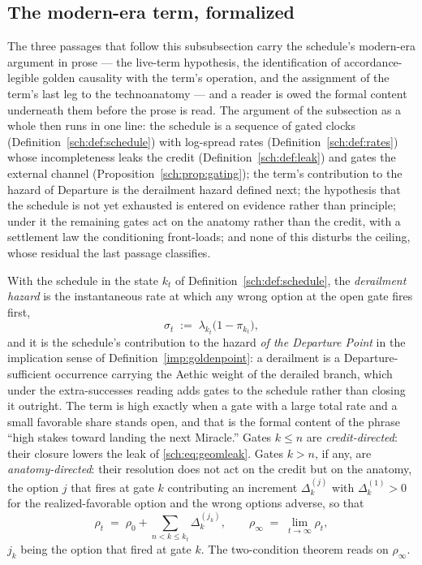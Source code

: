 \subsection{The modern-era term, formalized}\label{sch:subsub:modernterm}

The three passages that follow this subsubsection carry the
schedule's modern-era argument in prose --- the live-term
hypothesis, the identification of accordance-legible golden
causality with the term's operation, and the assignment of the
term's last leg to the technoanatomy --- and a reader is owed the
formal content underneath them before the prose is read. The
argument of the subsection as a whole then runs in one line: the
schedule is a sequence of gated clocks (Definition~\ref{sch:def:schedule})
with log-spread rates (Definition~\ref{sch:def:rates}) whose
incompleteness leaks the credit (Definition~\ref{sch:def:leak}) and
gates the external channel (Proposition~\ref{sch:prop:gating}); the
term's contribution to the hazard of Departure is the derailment
hazard defined next; the hypothesis that the schedule is not yet
exhausted is entered on evidence rather than principle; under it the
remaining gates act on the anatomy rather than the credit, with a
settlement law the conditioning front-loads; and none of this
disturbs the ceiling, whose residual the last passage classifies.

\begin{definition}\label{sch:def:derailment}
With the schedule in the state $k_t$ of Definition~\ref{sch:def:schedule},
the \emph{derailment hazard} is the instantaneous rate at which any
wrong option at the open gate fires first,
\begin{equation}\label{sch:eq:derailment}
\sigma_t\;:=\;\lambda_{k_t}\bigl(1-\pi_{k_t}\bigr),
\end{equation}
and it is the schedule's contribution to the hazard \emph{of the
Departure Point} in the implication sense of
Definition~\ref{imp:goldenpoint}: a derailment is a Departure-sufficient
occurrence carrying the Aethic weight of the derailed branch, which
under the extra-successes reading adds gates to the schedule rather
than closing it outright. The term is high exactly when a gate with a
large total rate and a small favorable share stands open, and that is
the formal content of the phrase ``high stakes toward landing the next
Miracle.'' Gates $k\le n$ are \emph{credit-directed}: their closure
lowers the leak of \eqref{sch:eq:geomleak}. Gates $k>n$, if any, are
\emph{anatomy-directed}: their resolution does not act on the credit
but on the anatomy, the option $j$ that fires at gate $k$ contributing
an increment $\Delta_{k}^{(j)}$ with $\Delta_{k}^{(1)}>0$ for the
realized-favorable option and the wrong options adverse, so that
\begin{equation}\label{sch:eq:rhoprocess}
\rho_t\;=\;\rho_0+\sum_{n<k\le k_t}\Delta_{k}^{(j_k)},
\qquad
\rho_\infty\;=\;\lim_{t\to\infty}\rho_t,
\end{equation}
$j_k$ being the option that fired at gate $k$. The two-condition
theorem reads on $\rho_\infty$.
\end{definition}


